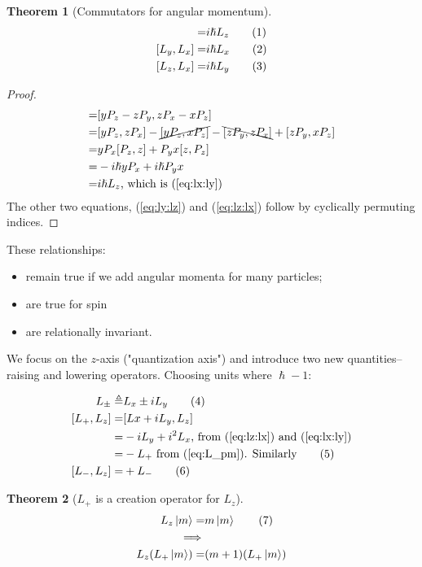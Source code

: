 \documentclass[]{article}
\newcommand\numberthis{\addtocounter{equation}{1}\tag{\theequation}}
\newtheorem{thm}{Theorem}
\begin{document}
\begin{thm}[Commutators for angular momentum]
	\begin{align*}
	[L_x,L_y]=& i \hslash L_z \numberthis \label{eq:lx:ly}\\
	[L_y,L_x]=& i \hslash L_x \numberthis \label{eq:ly:lz}\\
	[L_z,L_x]=& i \hslash L_y \numberthis \label{eq:lz:lx}	
	\end{align*}
\end{thm}
\begin{proof}
	\begin{align*}
	[L_x,L_y]=& [y P_z - z P_y,z P_x - x P_z]\\
	=&[y P_z, z P_x] -\cancel{[yP_z,xP_z]} -\bcancel{[zP_y,zP_x]} + [z P_y,x P_z] \\
	=& y P_x[P_z,z] + P_y x[z,P_z]\\
	=& -i \hslash y P_x + i \hslash P_y x\\
	=& i \hslash L_z \text{, which is (\ref{eq:lx:ly})} 
	\end{align*}
	The other two equations, (\ref{eq:ly:lz}) and (\ref{eq:lz:lx}) follow by cyclically permuting indices.
\end{proof}

 These relationships:
\begin{itemize}
	\item remain true if we add angular momenta for many particles;
	\item are true for spin
	 \item are relationally invariant.
\end{itemize}

We focus on the $z$-axis ("quantization axis") and introduce two new quantities--raising and lowering operators. Choosing units where $\hslash-1$:

\begin{align*}
	L_\pm \triangleq& L_x \pm i L_y \numberthis \label{eq:L_pm} \\
	[L_+,L_z] =& [Lx+i L_y,L_z]\\
	=& -iL_y + i^2 L_x \text{, from (\ref{eq:lz:lx}) and (\ref{eq:lx:ly})}\\
	=& -L_+ \text{ from (\ref{eq:L_pm}). Similarly} \numberthis \label{eq:L+:Lz}\\
	[L_-,L_z] =& + L_- \numberthis \label{eq:L-:Lz}
\end{align*}

\begin{thm}[$L_+$ is a creation operator for $L_z$]\label{thm:angular:momentum:creation}
	\begin{align*}
		L_z \ket{m} =& m \ket{m} \numberthis \label{eq:L:eigen}\\
		\implies&\\
		L_z (L_+ \ket{m}) =& (m+1) (L_+ \ket{m})
	\end{align*}	
\end{thm}
\end{document}
